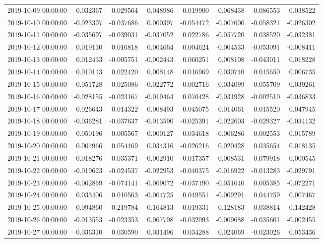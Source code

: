 \begin{tabular}{lrrrrrrr}
2019-10-09 00:00:00 & 0.032367 & 0.029564 & 0.048986 & 0.019900 & 0.068438 & 0.086553 & 0.038522 \\
2019-10-10 00:00:00 & -0.023397 & -0.037686 & 0.000397 & -0.054472 & -0.007600 & -0.058321 & -0.026302 \\
2019-10-11 00:00:00 & -0.035697 & -0.039031 & -0.037052 & 0.022786 & -0.057720 & 0.038520 & -0.032381 \\
2019-10-12 00:00:00 & 0.019130 & 0.016818 & 0.004664 & 0.004624 & -0.004533 & -0.053091 & -0.008411 \\
2019-10-13 00:00:00 & 0.012433 & -0.005751 & -0.002443 & 0.060251 & 0.008108 & -0.043011 & 0.018228 \\
2019-10-14 00:00:00 & 0.010113 & 0.022420 & 0.008148 & 0.016969 & 0.030740 & 0.015650 & 0.006735 \\
2019-10-15 00:00:00 & -0.051728 & -0.025086 & -0.022772 & -0.002716 & -0.034099 & -0.055709 & -0.039261 \\
2019-10-16 00:00:00 & -0.028155 & -0.023167 & -0.019464 & 0.070428 & -0.031928 & -0.002510 & -0.036833 \\
2019-10-17 00:00:00 & 0.026643 & 0.014322 & 0.008493 & 0.045075 & 0.014061 & 0.015520 & 0.047945 \\
2019-10-18 00:00:00 & -0.036281 & -0.037637 & -0.013590 & -0.025391 & -0.022603 & -0.029327 & -0.034132 \\
2019-10-19 00:00:00 & 0.050196 & 0.005567 & 0.000127 & 0.034618 & -0.006286 & 0.002553 & 0.015789 \\
2019-10-20 00:00:00 & 0.007966 & 0.054469 & 0.034316 & -0.026216 & 0.020428 & 0.035654 & 0.018135 \\
2019-10-21 00:00:00 & -0.018276 & 0.035371 & -0.002910 & -0.017357 & -0.008531 & 0.079918 & 0.000545 \\
2019-10-22 00:00:00 & -0.019623 & -0.024537 & -0.022953 & -0.040375 & -0.016922 & -0.013283 & -0.029791 \\
2019-10-23 00:00:00 & -0.062869 & -0.074141 & -0.069072 & -0.037190 & -0.051640 & 0.005385 & -0.072271 \\
2019-10-24 00:00:00 & 0.033406 & 0.010563 & -0.004725 & 0.049551 & -0.009291 & 0.044759 & 0.007467 \\
2019-10-25 00:00:00 & 0.094860 & 0.219784 & 0.164813 & 0.019331 & 0.128183 & 0.038814 & 0.142428 \\
2019-10-26 00:00:00 & -0.013553 & -0.023353 & 0.067798 & -0.032093 & -0.009688 & -0.035601 & -0.002455 \\
2019-10-27 00:00:00 & 0.036310 & 0.030590 & 0.031496 & 0.034288 & 0.024069 & -0.023026 & 0.053436 \\

\end{tabular}
